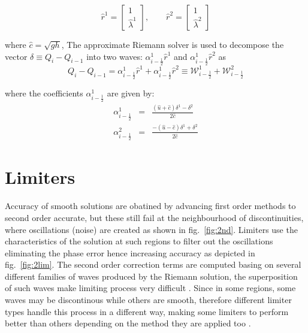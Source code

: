 \documentclass[12pt,a4paper]{article}
\begin{document}
	\begin{equation}
			\hat{r}^1 =  \begin{bmatrix} 1 \\ 	\hat{\lambda}^1 \end{bmatrix}, \qquad 	\hat{r}^2 =  \begin{bmatrix} 1 \\ 	\hat{\lambda}^2 \end{bmatrix}
			\label{vec}
	\end{equation}
	
	\noindent where $\hat{c} = \sqrt{gh}$, The approximate Riemann solver is used to decompose the vector  $ \delta \equiv Q_{i} - Q_{i-1}$ into two waves: $\alpha_{i-\frac{1}{2}}^{1} \hat{r}^1$ and $\alpha_{i-\frac{1}{2}}^{1} \hat{r}^2$ as 
	\begin{equation}
		Q_{i} - Q_{i-1} = \alpha_{i-\frac{1}{2}}^{1} \hat{r}^1 + \alpha_{i-\frac{1}{2}}^{1} \hat{r}^2 \equiv \mathcal{W}_{i-\frac{1}{2}}^{1} + \mathcal{W}_{i-\frac{1}{2}}^{2}
	\end{equation}
	
	\noindent where the coefficients $\alpha_{i-\frac{1}{2}}^{1}$ are given by:
	\begin{eqnarray}
		\alpha_{i-\frac{1}{2}}^{1} &=& \frac{(\hat{u} + \hat{c})\delta^{1} - \delta^2}{2\hat{c}}\\
		\alpha_{i-\frac{1}{2}}^{2} &=& \frac{-(\hat{u} - \hat{c})\delta^{1} + \delta^2}{2\hat{c}}
	\end{eqnarray}
	
	\section{Limiters}
	Accuracy of smooth solutions are obatined by advancing first order methods to second order accurate, but these still fail at the neighbourhood of discontinuities, where oscillations (noise) are created as shown in fig.~\ref{fig:2nd}. Limiters use the characteristics of the solution at such regions to filter out the oscillations eliminating the phase error hence increasing accuracy as depicted in fig.~\ref{fig:2lim}. The second order correction terms are computed basing on several different families of waves produced by the Riemann solution, the superposition of such waves make limiting process very difficult \cite{ge:2011} .  Since in some regions, some waves may be discontinous while others are smooth, therefore different limiter types handle this process in a different way, making some limiters to perform better than others depending on the method they are applied too \cite{be-ge-le-ma:2011}.\\
	
\end{document}
